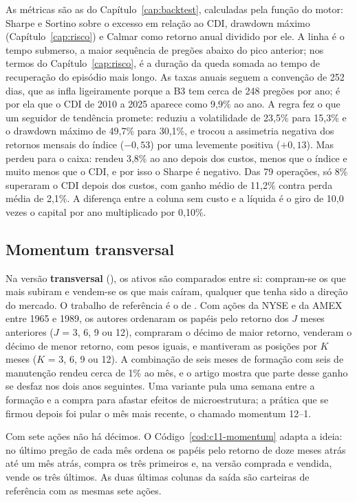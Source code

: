 As métricas são as do Capítulo~\ref{cap:backtest}, calculadas pela função  do motor: Sharpe e Sortino sobre o excesso em relação ao CDI, drawdown máximo (Capítulo~\ref{cap:risco}) e Calmar como retorno anual dividido por ele. A linha  é o tempo submerso, a maior sequência de pregões abaixo do pico anterior; nos termos do Capítulo~\ref{cap:risco}, é a duração da queda somada ao tempo de recuperação do episódio mais longo. As taxas anuais seguem a convenção de 252 dias, que as infla ligeiramente porque a B3 tem cerca de 248 pregões por ano; é por ela que o CDI de 2010 a 2025 aparece como 9,9\% ao ano. A regra fez o que um seguidor de tendência promete: reduziu a volatilidade de 23,5\% para 15,3\% e o drawdown máximo de 49,7\% para 30,1\%, e trocou a assimetria negativa dos retornos mensais do índice ($-0,53$) por uma levemente positiva ($+0,13$). Mas perdeu para o caixa: rendeu 3,8\% ao ano depois dos custos, menos que o índice e muito menos que o CDI, e por isso o Sharpe é negativo. Das 79 operações, só 8\% superaram o CDI depois dos custos, com ganho médio de 11,2\% contra perda média de 2,1\%. A diferença entre a coluna sem custo e a líquida é o giro de 10,0 vezes o capital por ano multiplicado por 0,10\%.

\subsection{Momentum transversal}

Na versão \textbf{transversal} (), os ativos são comparados entre si: compram-se os que mais subiram e vendem-se os que mais caíram, qualquer que tenha sido a direção do mercado. O trabalho de referência é o de \citet{jegadeesh1993}. Com ações da NYSE e da AMEX entre 1965 e 1989, os autores ordenaram os papéis pelo retorno dos $J$ meses anteriores ($J$ = 3, 6, 9 ou 12), compraram o décimo de maior retorno, venderam o décimo de menor retorno, com pesos iguais, e mantiveram as posições por $K$ meses ($K$ = 3, 6, 9 ou 12). A combinação de seis meses de formação com seis de manutenção rendeu cerca de 1\% ao mês, e o artigo mostra que parte desse ganho se desfaz nos dois anos seguintes. Uma variante pula uma semana entre a formação e a compra para afastar efeitos de microestrutura; a prática que se firmou depois foi pular o mês mais recente, o chamado momentum 12--1.

Com sete ações não há décimos. O Código~\ref{cod:c11-momentum} adapta a ideia: no último pregão de cada mês ordena os papéis pelo retorno de doze meses atrás até um mês atrás, compra os três primeiros e, na versão comprada e vendida, vende os três últimos. As duas últimas colunas da saída são carteiras de referência com as mesmas sete ações.

